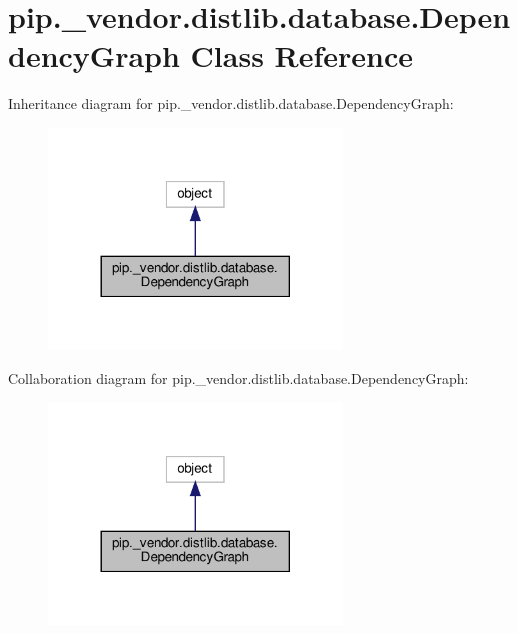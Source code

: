 \hypertarget{classpip_1_1__vendor_1_1distlib_1_1database_1_1DependencyGraph}{}\section{pip.\+\_\+vendor.\+distlib.\+database.\+Dependency\+Graph Class Reference}
\label{classpip_1_1__vendor_1_1distlib_1_1database_1_1DependencyGraph}


Inheritance diagram for pip.\+\_\+vendor.\+distlib.\+database.\+Dependency\+Graph\+:
\nopagebreak
\begin{figure}[H]
\begin{center}
\leavevmode
\includegraphics[width=221pt]{classpip_1_1__vendor_1_1distlib_1_1database_1_1DependencyGraph__inherit__graph}
\end{center}
\end{figure}


Collaboration diagram for pip.\+\_\+vendor.\+distlib.\+database.\+Dependency\+Graph\+:
\nopagebreak
\begin{figure}[H]
\begin{center}
\leavevmode
\includegraphics[width=221pt]{classpip_1_1__vendor_1_1distlib_1_1database_1_1DependencyGraph__coll__graph}
\end{center}
\end{figure}
